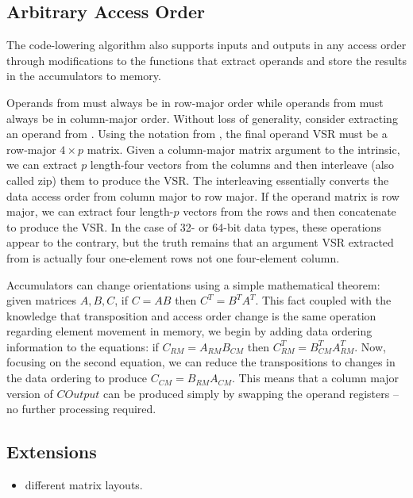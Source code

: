 \documentclass[\main/thesis.tex]{subfiles}
\begin{document}
\subsection{Arbitrary Access Order}
\label{sec:arbitraryOrder}
The code-lowering algorithm also supports inputs and outputs in any access order through modifications to the functions that extract operands and store the results in the accumulators to memory.

Operands from  must always be in row-major order while operands from  must always be in column-major order.
Without loss of generality, consider extracting an operand from .
Using the notation from , the final operand VSR must be a row-major $4 \times p$ matrix.
Given a column-major matrix argument to the intrinsic, we can extract $p$ length-four vectors from the columns and then interleave (also called zip) them to produce the VSR.
The interleaving essentially converts the data access order from column major to row major.
If the operand matrix is row major, we can extract four length-$p$ vectors from the rows and then concatenate to produce the VSR.
In the case of 32- or 64-bit data types, these operations appear to the contrary, but the truth remains that an argument VSR extracted from  is actually four one-element rows not one four-element column.

Accumulators can change orientations using a simple mathematical theorem: given matrices $A, B, C$, if $C = AB$ then $C^T=B^TA^T$.
This fact coupled with the knowledge that transposition and access order change is the same operation regarding element movement in memory, we begin by adding data ordering information to the equations: if $C_{RM}=A_{RM}B_{CM}$ then $C^T_{RM}=B^T_{CM}A^T_{RM}$.
Now, focusing on the second equation, we can reduce the transpositions to changes in the data ordering to produce $C_{CM}=B_{RM}A_{CM}$.
This means that a column major version of $COutput$ can be produced simply by swapping the operand registers -- no further processing required.

\subsection{Extensions}
\begin{itemize}
  \item different matrix layouts.
\end{itemize}
\end{document}
